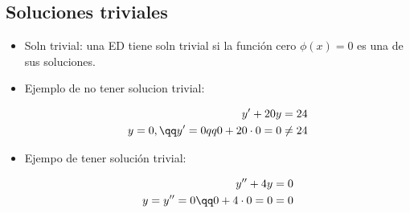 \subsection{Soluciones triviales}
\begin{itemize}
    \item Soln trivial: una ED tiene soln trivial si la función cero $\phi(x)=0$ es una de sus soluciones.
    \item Ejemplo de no tener solucion trivial:
        \begin{center}
           \begin{align*}
               y'+20y=24 \\ 
               y = 0, \qq y'=0 qq 0+20\cdot 0 = 0 \neq 24 \\ 
           \end{align*}
        \end{center}
    
    \item Ejempo de tener solución trivial:
        \begin{center}
           \begin{align*}
               y''+4y=0 \\ 
               y = y'' = 0 \qq 0+4\cdot 0 = 0 = 0 \\ 
           \end{align*}
        \end{center}
\end{itemize}

